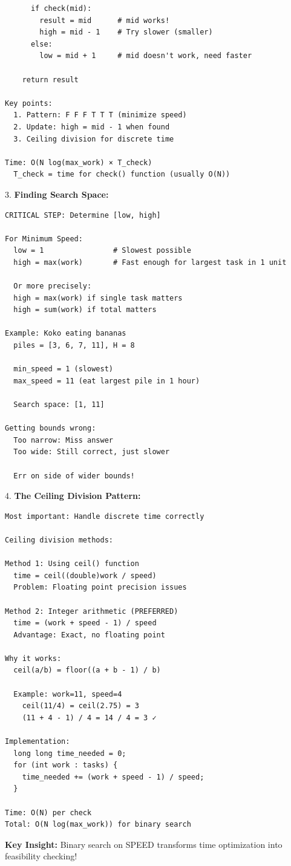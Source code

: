 \documentclass[11pt,a4paper,oneside]{book}
\begin{document}
\begin{tcolorbox}[
    enhanced,breakable,
    colback=white,
    colframe=deepblue,
    boxrule=1.5pt,
    arc=3mm,
    title=\textbf{The Time-Rate Relationship}
]
\begin{verbatim}
      if check(mid):
        result = mid      # mid works!
        high = mid - 1    # Try slower (smaller)
      else:
        low = mid + 1     # mid doesn't work, need faster
    
    return result

Key points:
  1. Pattern: F F F T T T (minimize speed)
  2. Update: high = mid - 1 when found
  3. Ceiling division for discrete time

Time: O(N log(max_work) × T_check)
  T_check = time for check() function (usually O(N))
\end{verbatim}

3. \textbf{Finding Search Space:}
\begin{verbatim}
CRITICAL STEP: Determine [low, high]

For Minimum Speed:
  low = 1                # Slowest possible
  high = max(work)       # Fast enough for largest task in 1 unit
  
  Or more precisely:
  high = max(work) if single task matters
  high = sum(work) if total matters

Example: Koko eating bananas
  piles = [3, 6, 7, 11], H = 8
  
  min_speed = 1 (slowest)
  max_speed = 11 (eat largest pile in 1 hour)
  
  Search space: [1, 11]

Getting bounds wrong:
  Too narrow: Miss answer
  Too wide: Still correct, just slower
  
  Err on side of wider bounds!
\end{verbatim}

4. \textbf{The Ceiling Division Pattern:}
\begin{verbatim}
Most important: Handle discrete time correctly

Ceiling division methods:

Method 1: Using ceil() function
  time = ceil((double)work / speed)
  Problem: Floating point precision issues

Method 2: Integer arithmetic (PREFERRED)
  time = (work + speed - 1) / speed
  Advantage: Exact, no floating point

Why it works:
  ceil(a/b) = floor((a + b - 1) / b)
  
  Example: work=11, speed=4
    ceil(11/4) = ceil(2.75) = 3
    (11 + 4 - 1) / 4 = 14 / 4 = 3 ✓

Implementation:
  long long time_needed = 0;
  for (int work : tasks) {
    time_needed += (work + speed - 1) / speed;
  }

Time: O(N) per check
Total: O(N log(max_work)) for binary search
\end{verbatim}

\textbf{Key Insight:}
Binary search on SPEED transforms time optimization into feasibility checking!
\end{tcolorbox}
\end{document}
